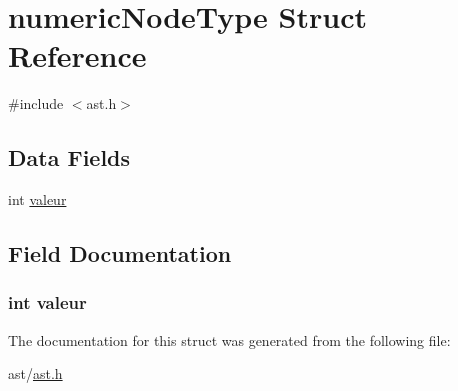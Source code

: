 \hypertarget{structnumeric_node_type}{}\section{numeric\+Node\+Type Struct Reference}
\label{structnumeric_node_type}


{\ttfamily \#include $<$ast.\+h$>$}

\subsection*{Data Fields}
\begin{DoxyCompactItemize}
\item 
int \hyperlink{structnumeric_node_type_a8e030c012e3b74a6d076739c4c7ecb69}{valeur}
\end{DoxyCompactItemize}


\subsection{Field Documentation}
\subsubsection[{\texorpdfstring{valeur}{valeur}}]{\setlength{\rightskip}{0pt plus 5cm}int valeur}\hypertarget{structnumeric_node_type_a8e030c012e3b74a6d076739c4c7ecb69}{}\label{structnumeric_node_type_a8e030c012e3b74a6d076739c4c7ecb69}


The documentation for this struct was generated from the following file\+:\begin{DoxyCompactItemize}
\item 
ast/\hyperlink{ast_8h}{ast.\+h}\end{DoxyCompactItemize}
